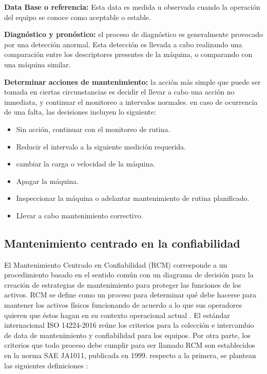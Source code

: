 \begin{description}
\item \textbf{Data Base o referencia:} Esta data es medida u observada cuando la operación del equipo se conoce como aceptable o estable. 

\item \textbf{Diagnóstico y pronóstico:} el proceso de diagnóstico es generalmente provocado por una detección anormal. Esta detección es llevada a cabo realizando una comparación entre los descriptores presentes de la máquina, o comparando con una máquina similar.

\item \textbf{Determinar acciones de mantenimiento:} la acción más simple que puede ser tomada en ciertas circunstancias es decidir el llevar a cabo una acción no inmediata,  y continuar el monitoreo a intervalos normales. en caso de ocurrencia de una falta, las decisiones incluyen lo siguiente:
\begin{itemize}
\item Sin acción, continuar con el monitoreo de rutina.
\item Reducir el intervalo a la siguiente medición requerida.
\item cambiar la carga o velocidad de la máquina.
\item Apagar la máquina.
\item Inspeccionar la máquina o adelantar mantenimiento de rutina planificado.
\item Llevar a cabo mantenimiento correctivo.

\end{itemize}
\end{description}




\subsection{Mantenimiento centrado en la confiabilidad}



El Mantenimiento Centrado en Confiabilidad (RCM) corresponde a un procedimiento basado en el sentido común con un diagrama de decisión para la creación de estrategias de mantenimiento para proteger las funciones de los activos. RCM se define como un proceso para determinar qué debe hacerse para mantener los activos físicos funcionando de acuerdo a lo que sus operadores quieren que éstos hagan en su contexto operacional actual \parencite{sifonte2017}.
El estándar internacional ISO 14224-2016 reúne los criterios para la colección e intercambio de data de mantenimiento y confiabilidad para los equipos. Por otra parte, los criterios que todo proceso debe cumplir para ser llamado RCM son establecidos en la norma SAE JA1011, publicada en 1999. respecto a la primera, se plantean las siguientes definiciones \parencite{iso2016}:\\

